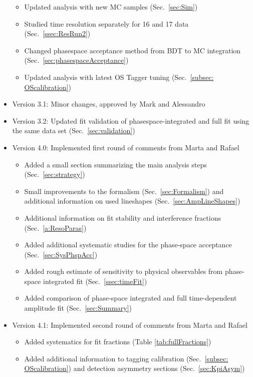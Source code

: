 \begin{itemize}
\begin{itemize}
		\item Updated analysis with new MC samples   (Sec.~\ref{sec:Sim})
	
		\item Studied time resolution separately for 16 and 17 data (Sec.~\ref{ssec:ResRun2}) 		
		
		\item Changed phasespace acceptance method from BDT to MC integration (Sec.~\ref{sec:phasespaceAcceptance}) 

		\item Updated analysis with latest OS Tagger tuning   (Sec.~\ref{subsec: OScalibration}) 		
		
	\end{itemize}
	
	\item Version 3.1:   Minor changes, approved by Mark and  Alessandro

	\item Version 3.2:   Updated fit validation of phasespace-integrated and full fit using the same data set (Sec.~\ref{sec:validation})

	\item Version 4.0:   Implemented first round of comments from Marta and Rafael
	\begin{itemize}
		\item Added a small section summarizing the main analysis steps (Sec.~\ref{sec:strategy})
		\item Small improvements to the formalism (Sec.~\ref{sec:Formalism}) and additional information on used lineshapes (Sec.~\ref{sec:AmpLineShapes})
		\item Additional information on fit stability and interference fractions (Sec.~\ref{a:ResoParas})
		\item Added additional systematic studies for the phase-space acceptance (Sec.~\ref{sec:SysPhspAcc})
		\item Added rough estimate of sensitivity to physical observables from phase-space integrated fit  (Sec.~\ref{ssec:timeFit})
		\item Added comparison of phase-space integrated and full time-dependent amplitude fit (Sec.~\ref{sec:Summary})
	\end{itemize}
	
		\item Version 4.1:   Implemented second round of comments from Marta and Rafael
	\begin{itemize}
		\item Added systematics for fit fractions (Table \ref{tab:fullFractions})
		\item Added additional information to tagging calibration (Sec.~\ref{subsec: OScalibration}) and detection asymmetry sections (Sec.~\ref{sec:KpiAsym})
	\end{itemize}
	

\end{itemize}
